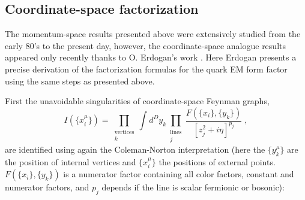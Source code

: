 \documentclass[%
 reprint,
 amsmath,amssymb,
 aps,
]{revtex4-1}
\begin{document}
\subsection{Coordinate-space factorization}
The momentum-space results presented above were extensively studied from the early 80's to the present day, however, the coordinate-space analogue results appeared only recently thanks to O. Erdogan's work \cite{ErdoganCS}. Here Erdogan presents a precise derivation of the factorization formulas for the quark EM form factor using the same steps as presented above. \par
 First the unavoidable singularities of coordinate-space Feynman graphs,
\begin{equation}
I(\{x_i^\mu\})=\prod_{\substack{\text{vertices}\\k}}\int d^Dy_k\prod_{\substack{\text{lines}\\j}}\frac{F(\{x_i\},\{y_k\})}{[z_j^2+i\eta]^{p_j}}\;,\label{fefo}
\end{equation}
 are identified using again the Coleman-Norton interpretation (here the $\{y_k^\mu\}$ are the position of internal vertices and $\{x_i^\mu\}$ the positions of external points. $F(\{x_i\},\{y_k\})$ is a numerator factor containing all color factors, constant and numerator factors, and $p_j$ depends if the line is scalar fermionic or bosonic):\par
 
\end{document}
